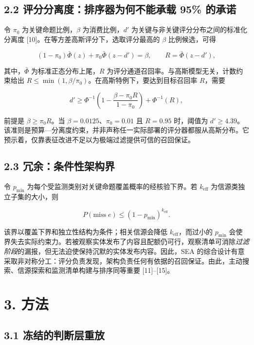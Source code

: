 \documentclass[
  chinese,
  conference,10pt]{IEEEtran}
\begin{document}
\subsection{2.2 评分分离度：排序器为何不能承载 95\% 的承诺}\label{ux8bc4ux5206ux5206ux79bbux5ea6ux6392ux5e8fux5668ux4e3aux4f55ux4e0dux80fdux627fux8f7d-95-ux7684ux627fux8bfa}

令 \(\pi_0\) 为关键命题比例，\(\beta\) 为消费比例，\(d'\) 为关键与非关键评分分布之间的标准化分离度 {[}10{]}。在等方差高斯评分下，选取评分最高的 \(\beta\) 比例候选，可得

\[
(1-\pi_0)\bar\Phi(z)+\pi_0\bar\Phi(z-d')=\beta,
\qquad R=\bar\Phi(z-d'),
\]

其中，\(\bar\Phi\) 为标准正态分布上尾，\(R\) 为评分通道召回率。与高斯模型无关，计数约束给出 \(R\le\min(1,\beta/\pi_0)\)。在高斯特例下，要达到目标召回率 \(R\)，需要

\[
d'\ge \Phi^{-1}\!\left(1-\frac{\beta-\pi_0R}{1-\pi_0}\right)+\Phi^{-1}(R),
\]

前提是 \(\beta\ge\pi_0R\)。当 \(\beta=0.0125\)、\(\pi_0=0.01\) 且 \(R=0.95\) 时，阈值为 \(d'\ge4.39\)。该准则是预算---分离度约束，并非声称任一实际部署的评分器都服从高斯分布。它预示着，仅靠表征改进不足以为极端过滤提供可信的召回保证。

\subsection{2.3 冗余：条件性架构界}\label{ux5197ux4f59ux6761ux4ef6ux6027ux67b6ux6784ux754c}

令 \(p_{\min}\) 为每个受监测类别对关键命题覆盖概率的经核验下界。若 \(k_{\mathrm{eff}}\) 为信源类独立子集的大小，则

\[
P(\mathrm{miss}\;e)\le(1-p_{\min})^{k_{\mathrm{eff}}}.
\]

该界以覆盖下界和独立性结构为条件；相关信源会降低 \(k_{\mathrm{eff}}\)，而过小的 \(p_{\min}\) 会使界失去实际约束力。若被观察实体发布了内容且配额仍可行，观察清单可消除\emph{过滤阶段}的漏报，但无法迫使保持沉默的实体发布内容。因此，SEA 的综合设计有意采取非对称分工：评分负责发现，架构负责任何有依据的召回保证。由此，主动搜索、信源探索和监测清单构建与排序同等重要 {[}11{]}--{[}15{]}。

\section{3. 方法}\label{ux65b9ux6cd5}

\subsection{3.1 冻结的判断层重放}\label{ux51bbux7ed3ux7684ux5224ux65adux5c42ux91cdux653e}
\end{document}
